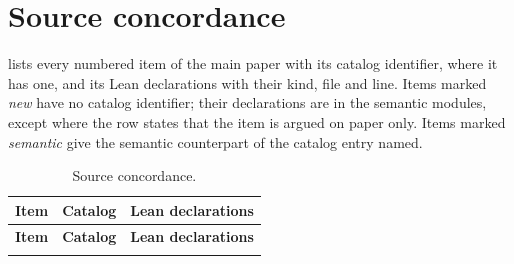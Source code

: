 \section{Source concordance}
\label{supp:concordance}

 lists every numbered item of the main paper with its catalog
identifier, where it has one, and its Lean declarations with their kind, file and line.
Items marked \emph{new} have no catalog identifier; their declarations are in the semantic
modules, except where the row states that the item is argued on paper only. Items marked \emph{semantic} give the semantic counterpart of the catalog entry
named.

{\scriptsize
\begin{longtable}{@{}l>{\raggedright\arraybackslash}p{2.4cm}>{\raggedright\arraybackslash}p{10.6cm}@{}}
\caption{Source concordance.}\label{tab:concordance}\\
\toprule
\textbf{Item} & \textbf{Catalog} & \textbf{Lean declarations} \\
\midrule
\endfirsthead
\toprule
\textbf{Item} & \textbf{Catalog} & \textbf{Lean declarations} \\
\midrule
\endhead
\bottomrule
\endfoot

\end{longtable}
}
